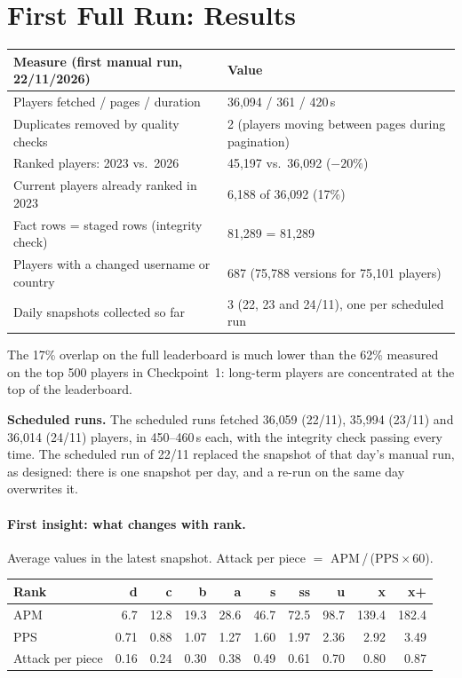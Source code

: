 \documentclass[11pt,a4paper]{article}
\begin{document}
\section{First Full Run: Results}\label{sec:results}
\begin{tabularx}{\textwidth}{@{}p{6.4cm}Y@{}}
\toprule
\textbf{Measure (first manual run, 22/11/2026)} & \textbf{Value} \\
\midrule
Players fetched / pages / duration & 36{,}094 / 361 / 420\,s \\
Duplicates removed by quality checks & 2 (players moving between pages during pagination) \\
Ranked players: 2023 vs.\ 2026 & 45{,}197 vs.\ 36{,}092 ($-20\%$) \\
Current players already ranked in 2023 & 6{,}188 of 36{,}092 (17\%) \\
Fact rows = staged rows (integrity check) & 81{,}289 = 81{,}289 \\
Players with a changed username or country & 687 (75{,}788 versions for 75{,}101 players) \\
Daily snapshots collected so far & 3 (22, 23 and 24/11), one per scheduled run \\
\bottomrule
\end{tabularx}

\medskip
\noindent The 17\% overlap on the full leaderboard is much lower than the
62\% measured on the top 500 players in Checkpoint~1: long-term players are
concentrated at the top of the leaderboard.

\medskip
\noindent\textbf{Scheduled runs.} The scheduled runs fetched 36{,}059
(22/11), 35{,}994 (23/11) and 36{,}014 (24/11) players, in 450--460\,s each,
with the integrity check passing every time. The scheduled run of 22/11
replaced the snapshot of that day's manual run, as designed: there is one
snapshot per day, and a re-run on the same day overwrites it.

\paragraph{First insight: what changes with rank.} Average values in the
latest snapshot. Attack per piece $=$ APM\,/\,(PPS\,$\times$\,60).

\begin{center}
\small
\begin{tabular}{@{}lrrrrrrrrr@{}}
\toprule
Rank & d & c & b & a & s & ss & u & x & x+ \\
\midrule
APM             & 6.7  & 12.8 & 19.3 & 28.6 & 46.7 & 72.5 & 98.7 & 139.4 & 182.4 \\
PPS             & 0.71 & 0.88 & 1.07 & 1.27 & 1.60 & 1.97 & 2.36 & 2.92  & 3.49  \\
Attack per piece & 0.16 & 0.24 & 0.30 & 0.38 & 0.49 & 0.61 & 0.70 & 0.80  & 0.87  \\
\bottomrule
\end{tabular}
\end{center}
\end{document}
